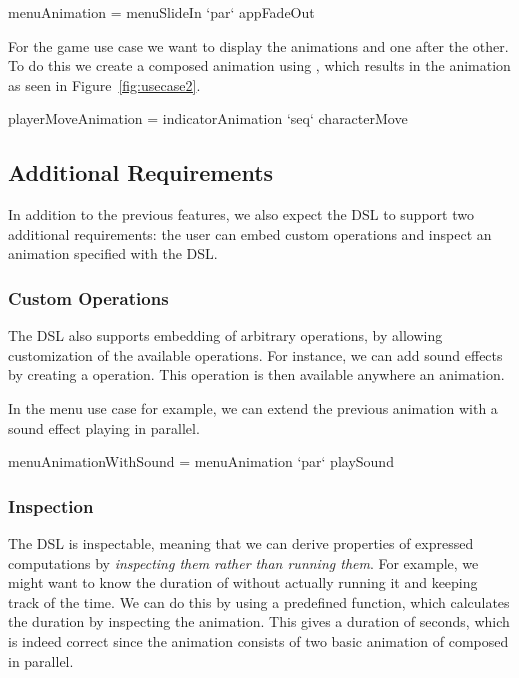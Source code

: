 \begin{spec}
menuAnimation = menuSlideIn `par` appFadeOut
\end{spec}

For the game use case we want to display the animations  and  one after the other. To do this we create a composed animation using , which results in the animation as seen in Figure~\ref{fig:usecase2}.

\begin{spec}
playerMoveAnimation = indicatorAnimation `seq` characterMove
\end{spec}

\subsection{Additional Requirements}

In addition to the previous features, we also expect the DSL to support two additional requirements: the user can embed custom operations and inspect an animation specified with the DSL.

\subsubsection{Custom Operations}


The DSL also supports embedding of arbitrary operations, by allowing customization of the available operations. For instance, we can add sound effects by creating a  operation. This operation is then available anywhere an animation.

In the menu use case for example, we can extend the previous  animation with a sound effect playing in parallel.

\begin{spec}
menuAnimationWithSound = menuAnimation `par` playSound
\end{spec}

\subsubsection{Inspection}

The DSL is inspectable, meaning that we can derive properties of expressed computations by \emph{inspecting them rather than running them}. For example, we might want to know the duration of  without actually running it and keeping track of the time. We can do this by using a predefined  function, which calculates the duration by inspecting the animation. This gives a duration of  seconds, which is indeed correct since the animation consists of two basic animation of  composed in parallel.


